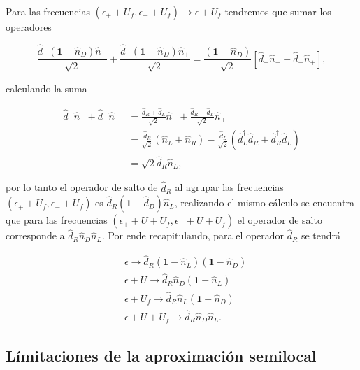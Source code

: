 \begin{appendixs}
Para las frecuencias $(\epsilon_{+}+U_{f},\epsilon_{-}+U_{f})\to \epsilon + U_{f}$ tendremos que sumar los operadores

\begin{equation*}
    \frac{\hat{d}_{+}(\textbf{1}-\hat{n}_{D})\hat{n}_{-} }{\sqrt{2}} + \frac{\hat{d}_{-}(\textbf{1}-\hat{n}_{D})\hat{n}_{+} }{\sqrt{2}} = \frac{(\textbf{1}-\hat{n}_{D})}{\sqrt{2}} [\hat{d}_{+}\hat{n}_{-} + \hat{d}_{-}\hat{n}_{+}],
\end{equation*}

calculando la suma

\begin{align*}
    \hat{d}_{+}\hat{n}_{-} + \hat{d}_{-}\hat{n}_{+} & = \frac{\hat{d}_{R}+\hat{d}_{L}}{\sqrt{2}}\hat{n}_{-} + \frac{\hat{d}_{R}-\hat{d}_{L}}{\sqrt{2}}\hat{n}_{+}  \\
    & = \frac{\hat{d}_{R}}{\sqrt{2}}(\hat{n}_{L}+\hat{n}_{R}) - \frac{\hat{d}_{L}}{\sqrt{2}}(\hat{d}^{\dagger}_{L}\hat{d}_{R}+\hat{d}^{\dagger}_{R}\hat{d}_{L}) \\
    & = \sqrt{2}\hat{d}_{R}\hat{n}_{L},
\end{align*}

por lo tanto el operador de salto de $\hat{d}_{R}$ al agrupar las frecuencias $(\epsilon_{+}+U_{f},\epsilon_{-}+U_{f})$ es $\hat{d}_{R}(\textbf{1}-\hat{d}_{D})\hat{n}_{L}$, realizando el mismo cálculo se encuentra que para las frecuencias $(\epsilon_{+}+U+U_{f},\epsilon_{-}+U+U_{f})$ el operador de salto corresponde a $\hat{d}_{R}\hat{n}_{D}\hat{n}_{L}$. Por ende recapitulando, para el operador $\hat{d}_{R}$ se tendrá

\begin{align*}
    &\epsilon \to \hat{d}_{R}(\textbf{1}-\hat{n}_{L})(\textbf{1}-\hat{n}_{D})\\
   &\epsilon + U \to \hat{d}_{R}\hat{n}_{D}(\textbf{1}-\hat{n}_{L})\\
    &\epsilon +U_{f}\to \hat{d}_{R}\hat{n}_{L}(\textbf{1}-\hat{n}_{D})\\
    &\epsilon +U+U_{f}\to \hat{d}_{R}\hat{n}_{D}\hat{n}_{L}.
\end{align*}

\label{apendix5frecuencygroup}

\subsection{Límitaciones de la aproximación semilocal}

\label{apendix5límites}


\end{appendixs}
